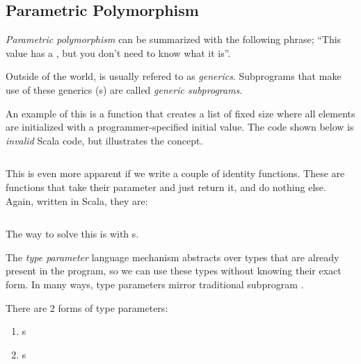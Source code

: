 \subsection{Parametric Polymorphism}\label{subsec:Parametric_Polymorphism}
\begin{definition}\label{def:Parametric_Polymorphism}
  \emph{Parametric polymorphism} can be summarized with the following phrase; ``This value has a , but you don't need to know what it is''.

  \begin{remark}[Generics]\label{rmk:Generics}
    Outside of the  world,  is usually refered to as \emph{generics}.
    Subprograms that make use of these generics (s) are called \emph{generic subprograms}.
  \end{remark}
\end{definition}

An example of this is a function that creates a list of fixed size where all elements are initialized with a programmer-specified initial value.
The code shown below is \emph{invalid} Scala code, but illustrates the concept.
\inputminted[frame=lines,linenos]{scala}{./EDAP05-Concepts_Programming_Languages-Sections/Advanced_Data_Types/Code/No_Polymorphism_Initial_List.scala}

This is even more apparent if we write a couple of identity functions.
These are functions that take their parameter and just return it, and do nothing else.
Again, written in Scala, they are:
\inputminted[frame=lines,linenos]{scala}{./EDAP05-Concepts_Programming_Languages-Sections/Advanced_Data_Types/Code/No_Polymorphism_Identity_Functions.scala}

The way to solve this is with s.
\begin{definition}\label{def:Type_Parameter}
  The \emph{type parameter} language mechanism abstracts over types that are already present in the program, so we can use these types without knowing their exact form.
  In many ways, type parameters mirror traditional subprogram .

  There are 2 forms of type parameters:
  \begin{enumerate}[noitemsep]
  \item {}s
  \item {}s
  \end{enumerate}
\end{definition}

